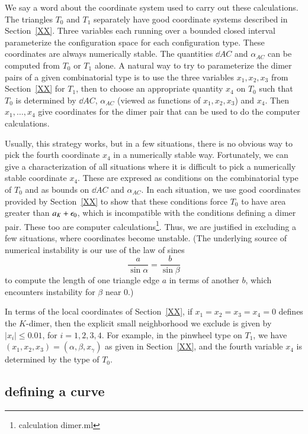 We say a word about the coordinate system used to carry out these calculations.
The triangles $T_0$ and $T_1$ separately have good coordinate systems described in Section~\ref{XX}.  Three variables
each running over a bounded closed interval parameterize the configuration space for each configuration type.
These coordinates are always numerically stable.  The quantities $\dd{A}{C}$ and $\alpha_{AC}$ can be computed from $T_0$ or $T_1$  alone.
A natural way to try to parameterize the dimer pairs of a given combinatorial type is to use the three variables $x_1,x_2,x_3$ from Section~\ref{XX} for $T_1$,
then to choose an appropriate quantity $x_4$ on $T_0$ such that $T_0$ is determined by $\dd{A}{C}$, $\alpha_{AC}$ (viewed as functions of $x_1,x_2,x_3$) and
$x_4$.  Then $x_1,\ldots,x_4$ give coordinates for the dimer pair that can be used to do the computer calculations.

Usually, this strategy works, but in a few situations, there is no obvious way to pick the fourth coordinate $x_4$ in a numerically stable way.
Fortunately, we can give a characterization of all situations where it is difficult to pick a numerically stable coordinate $x_4$.  These are
expresed as conditions on the combinatorial type of $T_0$ and as bounds on $\dd{A}{C}$ and $\alpha_{AC}$.  In each situation, we use good
coordinates provided by Section~\ref{XX} to show that
these conditions force $T_0$ to have area greater than $a_K+\epsilon_0$, which is incompatible with the conditions defining a dimer pair.  
These too are computer calculations\footnote{calculation dimer.ml}.
Thus, we are justified in excluding a few situations, where coordinates become unstable.  (The underlying source of numerical instability is
our use of the law of sines 
\[
\frac{a}{\sin\alpha} = \frac{b}{\sin\beta}
\]
to compute the length of one triangle edge $a$ in terms of another $b$, which encounters instability for $\beta$ near $0$.)

In terms of the local coordinates of Section~\ref{XX}, if $x_1=x_2=x_3=x_4=0$ defines the $K$-dimer, then the explicit
small neighborhood we exclude is given by $|x_i|\le 0.01$, for $i=1,2,3,4$.  For example, in the pinwheel type on $T_1$, 
we have $(x_1,x_2,x_3)=(\alpha,\beta,x_\gamma)$ as given in Section~\ref{XX}, and the fourth variable $x_4$ is determined
by the type of $T_0$.

\subsection{defining a curve}

